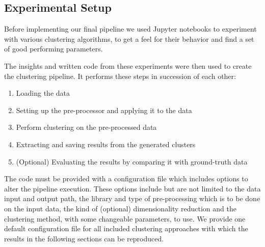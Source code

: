 \subsection{Experimental Setup}
Before implementing our final pipeline we used Jupyter notebooks to experiment with various clustering algorithms, to get a feel for their behavior and find a set of good performing parameters.

The insights and written code from these experiments were then used to create the clustering pipeline. It performs these steps in succession of each other:
\begin{enumerate}
    \item Loading the data
    \item Setting up the pre-processor and applying it to the data
    \item Perform clustering on the pre-processed data
    \item Extracting and saving results from the generated clusters
    \item (Optional) Evaluating the results by comparing it with ground-truth data
\end{enumerate}

The code must be provided with a configuration file which includes options to alter the pipeline execution. These options include but are not limited to the data input and output path, the library and type of pre-processing which is to be done on the input data, the kind of (optional) dimensionality reduction and the clustering method, with some changeable parameters, to use.
We provide one default configuration file for all included clustering approaches with which the results in the following sections can be reproduced. 